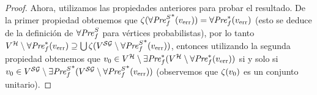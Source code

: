 \begin{proof}
       
       Ahora, utilizamos las propiedades anteriores para probar el resultado. De la primer propiedad obtenemos que $\zeta({\forall\mathit{Pre}^S_f}^*(v_{\text{err}})) = \forall\mathit{Pre}_f^*(v_{\text{err}})$ (esto se deduce de la definición de $\forall\mathit{Pre}^S_f$ para vértices probabilistas),  
       por lo tanto $V^{\mathcal{H}} \setminus \forall\mathit{Pre}_f^*(v_{\text{err}}) \supseteq \bigcup \zeta(V^{\mathcal{SG}} \setminus {\forall\mathit{Pre}^S_f}^*(v_{\text{err}}))$, entonces utilizando la segunda propiedad obtenemos que $v_0 \in V^{\mathcal{H}} \setminus \exists\mathit{Pre}_f^*(V^{\mathcal{H}} \setminus \forall\mathit{Pre}_f^*(v_{\text{err}}))$ si y solo si   
       $v_0 \in V^{\mathcal{SG}} \setminus {\exists\mathit{Pre}^S_f}^*(V^{\mathcal{SG}} \setminus {\forall\mathit{Pre}^S_f}^*(v_{\text{err}}))$ (observemos que $\zeta(v_0)$ es un conjunto unitario).
\end{proof}